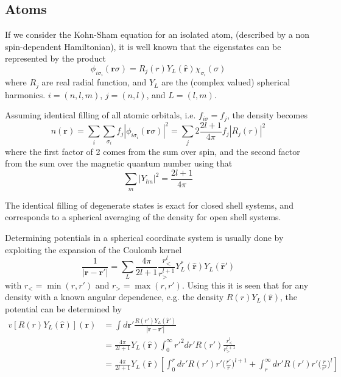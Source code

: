 \documentclass[a4paper]{article}
\newcommand{\h}[1]{\hat{#1}}
\newcommand{\br}{\mathbf{r}}
\begin{document}
\subsection{Atoms}
If we consider the Kohn-Sham equation for an isolated atom, (described
by a non spin-dependent Hamiltonian), it is well known that the
eigenstates can be represented by the product
%
\begin{equation}
  \phi_{i\sigma_i}(\br\sigma) = R_j(r) Y_L(\h{\br})\chi_{\sigma_i}(\sigma)
\end{equation}
%
where $R_j$ are real radial function, and $Y_L$ are the (complex
valued) spherical harmonics. $i=(n,l,m)$, $j=(n,l)$, and $L = (l,m)$.
\par Assuming identical filling of all atomic orbitals, i.e. $f_{i
  \sigma} = f_j$, the density becomes
%
\begin{equation}
  n(\br) = \sum_i \sum_{\sigma_i} f_j|\phi_{i\sigma_i}(\br\sigma)|^2 = \sum_j 2 \frac{2l+1}{4\pi} f_j|R_j(r)|^2
\end{equation}
%
where the first factor of 2 comes from the sum over spin, and the
second factor from the sum over the magnetic quantum number using that
%
\begin{equation}
  \sum_m |Y_{lm}|^2 = \frac{2l+1}{4\pi}
\end{equation}
%
\par The identical filling of degenerate states is exact for closed
shell systems, and corresponds to a spherical averaging of the density
for open shell systems.
\par Determining potentials in a spherical coordinate system is
usually done by exploiting the expansion of the Coulomb kernel
%
\begin{equation}
  \frac{1}{|\br-\br'|} = \sum_L \frac{4\pi}{2l+1} \frac{r_<^l}{r_>^{l+1}} Y_L^*(\h{\br})Y_L(\h{\br}')
\end{equation}
%
with $r_< = \min(r, r')$ and $r_> = \max(r, r')$. Using this it is
seen that for any density with a known angular dependence, e.g. the
density $R(r) Y_L(\h{\br})$, the potential can be determined by
%
\begin{equation}\label{eq: radial potential}
  \begin{split}
    v[R(r) Y_L(\h{\br})](\br) &= \int d\br' \frac{R(r') Y_L(\h{\br}')}{|\br - \br'|}\\
    &= \frac{4\pi}{2l+1} Y_L(\h{\br}) \int_0^\infty r'^2dr' R(r') \frac{r_<^l}{r_>^{l+1}}\\
    &= \frac{4\pi}{2l+1} Y_L(\h{\br}) \left[\int_0^r dr' R(r')r'\Big(\frac{r'}{r}\Big)^{l+1} + \int_r^\infty dr' R(r')r'\Big(\frac{r}{r'}\Big)^l \right]
  \end{split}
\end{equation}
\end{document}
